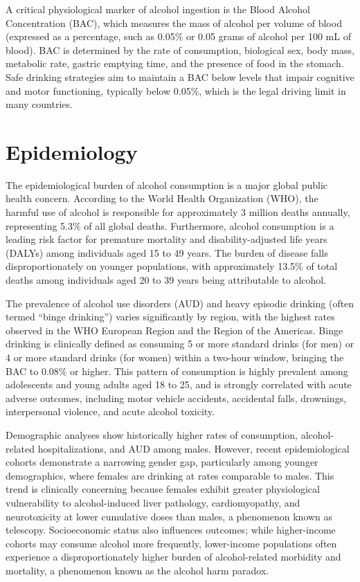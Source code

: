 A critical physiological marker of alcohol ingestion is the Blood Alcohol Concentration (BAC), which measures the mass of alcohol per volume of blood (expressed as a percentage, such as 0.05\% or 0.05 grams of alcohol per 100 mL of blood). BAC is determined by the rate of consumption, biological sex, body mass, metabolic rate, gastric emptying time, and the presence of food in the stomach. Safe drinking strategies aim to maintain a BAC below levels that impair cognitive and motor functioning, typically below 0.05\%, which is the legal driving limit in many countries.

\section*{Epidemiology}
The epidemiological burden of alcohol consumption is a major global public health concern. According to the World Health Organization (WHO), the harmful use of alcohol is responsible for approximately 3 million deaths annually, representing 5.3\% of all global deaths. Furthermore, alcohol consumption is a leading risk factor for premature mortality and disability-adjusted life years (DALYs) among individuals aged 15 to 49 years. The burden of disease falls disproportionately on younger populations, with approximately 13.5\% of total deaths among individuals aged 20 to 39 years being attributable to alcohol.

The prevalence of alcohol use disorders (AUD) and heavy episodic drinking (often termed ``binge drinking'') varies significantly by region, with the highest rates observed in the WHO European Region and the Region of the Americas. Binge drinking is clinically defined as consuming 5 or more standard drinks (for men) or 4 or more standard drinks (for women) within a two-hour window, bringing the BAC to 0.08\% or higher. This pattern of consumption is highly prevalent among adolescents and young adults aged 18 to 25, and is strongly correlated with acute adverse outcomes, including motor vehicle accidents, accidental falls, drownings, interpersonal violence, and acute alcohol toxicity.

Demographic analyses show historically higher rates of consumption, alcohol-related hospitalizations, and AUD among males. However, recent epidemiological cohorts demonstrate a narrowing gender gap, particularly among younger demographics, where females are drinking at rates comparable to males. This trend is clinically concerning because females exhibit greater physiological vulnerability to alcohol-induced liver pathology, cardiomyopathy, and neurotoxicity at lower cumulative doses than males, a phenomenon known as telescopy. Socioeconomic status also influences outcomes; while higher-income cohorts may consume alcohol more frequently, lower-income populations often experience a disproportionately higher burden of alcohol-related morbidity and mortality, a phenomenon known as the alcohol harm paradox.

